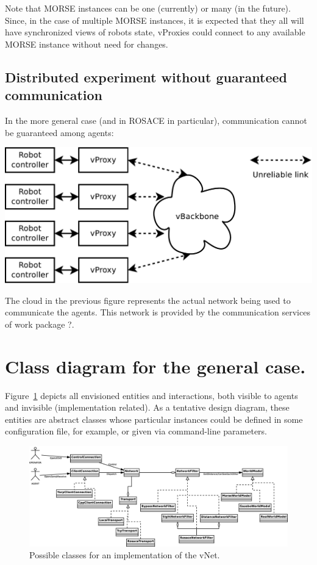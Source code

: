 \documentclass[a4paper,11pt]{article}
\begin{document}
Note that MORSE instances can be one (currently) or many (in the future). Since, in the case of multiple MORSE instances, it is expected that they all will have synchronized views of robots state, vProxies could connect to any available MORSE instance without need for changes.

\subsection{Distributed experiment without guaranteed communication}

In the more general case (and in ROSACE in particular), communication cannot be guaranteed among agents:

\begin{center}
\includegraphics[width=0.666\columnwidth]{figures/distrib}
\end{center}

The cloud in the previous figure represents the actual network being used to communicate the agents. This network is provided by the communication services of work package ?.

\section{Class diagram for the general case.}

Figure~\ref{fig:classes} depicts all envisioned entities and interactions, both visible to agents and invisible (implementation related). As a tentative design diagram, these entities are abstract classes whose particular instances could be defined in some configuration file, for example, or given via command-line parameters.

\begin{figure}
\begin{center}
\includegraphics[width=0.999\columnwidth]{figures/classes}
\end{center}
\caption{Possible classes for an implementation of the vNet.}
\label{fig:classes}
\end{figure}
\end{document}

